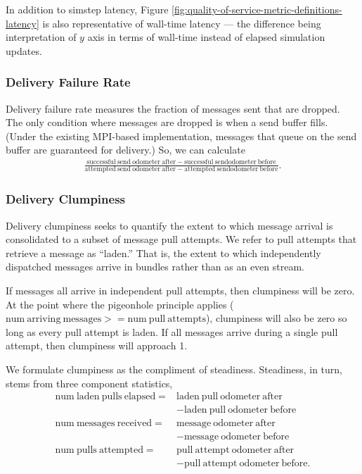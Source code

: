 In addition to simstep latency, Figure \ref{fig:quality-of-service-metric-definitions-latency} is also representative of wall-time latency --- the difference being interpretation of $y$ axis in terms of wall-time instead of elapsed simulation updates.

\subsubsection{Delivery Failure Rate} \label{sec:delivery-failure-rate-metric}

Delivery failure rate measures the fraction of messages sent that are dropped.
The only condition where messages are dropped is when a send buffer fills.
(Under the existing MPI-based implementation, messages that queue on the send buffer are guaranteed for delivery.)
So, we can calculate
\begin{align*}
  \frac{
    \mathrm{successful\ send\ odometer\ after} - \mathrm{successful\ send odometer\ before}
  }{
    \mathrm{attempted\ send\ odometer\ after} - \mathrm{attempted\ send odometer\ before}
  }.
\end{align*}

\subsubsection{Delivery Clumpiness} \label{sec:delivery-clumpiness-metric}

Delivery clumpiness seeks to quantify the extent to which message arrival is consolidated to a subset of message pull attempts.
We refer to pull attempts that retrieve a message as ``laden.''
That is, the extent to which independently dispatched messages arrive in bundles rather than as an even stream.

If messages all arrive in independent pull attempts, then clumpiness will be zero.
At the point where the pigeonhole principle applies ($\mathrm{num\ arriving\ messages} >= \mathrm{num\ pull\ attempts}$), clumpiness will also be zero so long as every pull attempt is laden.
If all messages arrive during a single pull attempt, then clumpiness will approach 1.

We formulate clumpiness as the compliment of steadiness.
Steadiness, in turn, stems from three component statistics,
\begin{align*}
\mathrm{num\ laden\ pulls\ elapsed} =& \mathrm{laden\ pull\ odometer\ after} \\
  &- \mathrm{laden\ pull\ odometer\ before} \\
\mathrm{num\ messages\ received} =& \mathrm{message\ odometer\ after} \\
  &- \mathrm{message\ odometer\ before} \\
\mathrm{num\ pulls\ attempted} =& \mathrm{pull\ attempt\ odometer\ after} \\
  &- \mathrm{pull\ attempt\ odometer\ before}
.
\end{align*}

